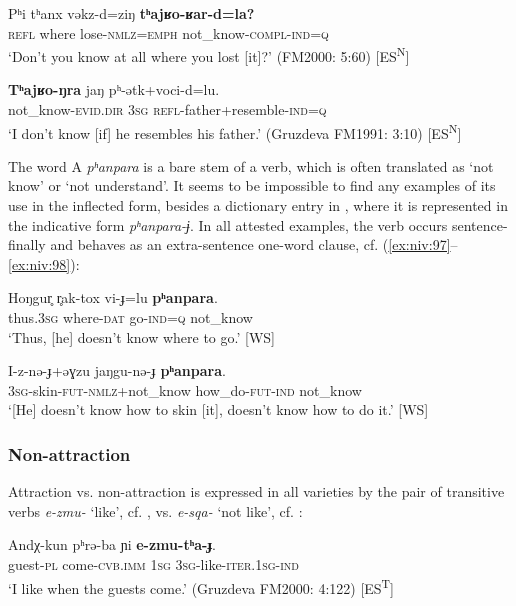 \documentclass[output=paper,colorlinks,citecolor=brown]{langscibook}
\begin{document}
\ea\label{ex:niv:95}
    \gll Pʰi tʰanx vəkz-d=ziŋ \textbf{tʰajʁo-ʁar-d=la?} \\ 
         \textsc{refl} where lose\textsc{{}-nmlz=emph} not\_know-\textsc{compl-ind=q} \\
    \glt ‘Don’t you know at all where you lost [it]?’ (FM2000: 5:60) [ES\textsuperscript{N}]
\z 

\ea\label{ex:niv:96}
    \gll \textbf{Tʰajʁo-ŋra} jaŋ pʰ-ətk+voci-d=lu. \\ 
          not\_know-\textsc{evid.dir} \textsc{3sg} \textsc{refl}{}-father+resemble-\textsc{ind=q}\\
    \glt ‘I don’t know [if] he resembles his father.’ (Gruzdeva FM1991: 3:10) [ES\textsuperscript{N}]
\z 

The word A \textit{pʰanpara} is a bare stem of a verb, which is often translated as ‘not know’ or ‘not understand’. It seems to be impossible to find any examples of its use in the inflected form, besides a dictionary entry in \citet[282]{SaveljevaTaksami1970}, where it is represented in the indicative form \textit{pʰanpara-ɉ}. In all attested examples, the verb occurs sentence-finally and behaves as an extra-sentence one-word clause, cf. (\ref{ex:niv:97}--\ref{ex:niv:98}):

\ea\label{ex:niv:97}
    \gll Hoŋgur̥ r̥ak-tox vi-ɟ=lu \textbf{pʰanpara}. \\ 
         thus.\textsc{3sg} where-\textsc{dat} go-\textsc{ind=q} not\_know \\
    \glt ‘Thus, [he] doesn’t know where to go.’ \citep[244]{Panfilov1965} [WS]
\z 

\ea\label{ex:niv:98}
    \gll I-z-nə{}-ɟ+əɣzu jaŋgu-nə{}-ɟ \textbf{pʰanpara}. \\ 
         \textsc{3sg}{}-skin-\textsc{fut-nmlz}+not\_know how\_do-\textsc{fut}-\textsc{ind} not\_know \\
    \glt ‘[He] doesn’t know how to skin [it], doesn’t know how to do it.’ \citep[248]{Panfilov1965} [WS]
\z 

\subsubsection{Non-attraction}

Attraction vs. non-attraction is expressed in all varieties by the pair of transitive verbs \textit{e-zmu-} ‘like’, cf. , vs. \textit{e-sqa-} ‘not like’, cf. :

\ea\label{ex:niv:99}
    \gll Andχ-kun pʰrə{}-ba ɲi \textbf{e-zmu-tʰa-ɟ}. \\ 
         guest-\textsc{pl} come-\textsc{cvb.imm} \textsc{1sg} \textsc{3sg}{}-like-\textsc{iter.1sg-ind} \\
    \glt ‘I like when the guests come.’ (Gruzdeva FM2000: 4:122) [ES\textsuperscript{T}]
\z 
\end{document}
